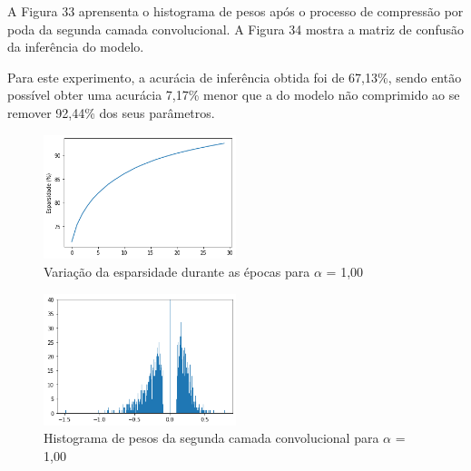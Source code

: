 A Figura 33 aprensenta o histograma de pesos após o processo de compressão por poda da segunda camada convolucional. A Figura 34 mostra a matriz de confusão da inferência do modelo.

Para este experimento, a acurácia de inferência obtida foi de 67,13\%, sendo então possível obter uma acurácia 7,17\% menor que a do modelo não comprimido ao se remover 92,44\% dos seus parâmetros.

\begin{figure}[H]
	\includegraphics[width=0.5\textwidth, keepaspectratio=true]{figuras/CAP4/esparsidade10.png}
	\centering
	\caption[Variação da esparsidade durante as épocas para $\alpha$ = 1,00]{Variação da esparsidade durante as épocas para $\alpha$ = 1,00}
\end{figure}

\begin{figure}[H]
	\includegraphics[width=0.5\textwidth, keepaspectratio=true]{figuras/CAP4/hist10_.png}
	\centering
	\caption[Histograma de pesos da segunda camada convolucional para $\alpha$ = 1,00]{Histograma de pesos da segunda camada convolucional para $\alpha$ = 1,00}
\end{figure}

